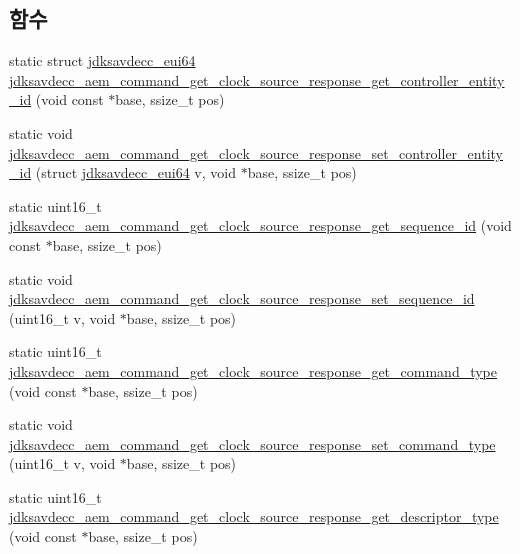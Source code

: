 \subsection*{함수}
\begin{DoxyCompactItemize}
\item 
static struct \hyperlink{structjdksavdecc__eui64}{jdksavdecc\+\_\+eui64} \hyperlink{group__command__get__clock__source__response_gad6f0c4c79b037aecee0801b470d4bec2}{jdksavdecc\+\_\+aem\+\_\+command\+\_\+get\+\_\+clock\+\_\+source\+\_\+response\+\_\+get\+\_\+controller\+\_\+entity\+\_\+id} (void const $\ast$base, ssize\+\_\+t pos)
\item 
static void \hyperlink{group__command__get__clock__source__response_ga8e75d2002ae108cf35d764a3eade7243}{jdksavdecc\+\_\+aem\+\_\+command\+\_\+get\+\_\+clock\+\_\+source\+\_\+response\+\_\+set\+\_\+controller\+\_\+entity\+\_\+id} (struct \hyperlink{structjdksavdecc__eui64}{jdksavdecc\+\_\+eui64} v, void $\ast$base, ssize\+\_\+t pos)
\item 
static uint16\+\_\+t \hyperlink{group__command__get__clock__source__response_ga8e0a46be31cf0c42e08dc7ce1d459a40}{jdksavdecc\+\_\+aem\+\_\+command\+\_\+get\+\_\+clock\+\_\+source\+\_\+response\+\_\+get\+\_\+sequence\+\_\+id} (void const $\ast$base, ssize\+\_\+t pos)
\item 
static void \hyperlink{group__command__get__clock__source__response_ga0212a00ad0ce852f31cdf7c0026e37f0}{jdksavdecc\+\_\+aem\+\_\+command\+\_\+get\+\_\+clock\+\_\+source\+\_\+response\+\_\+set\+\_\+sequence\+\_\+id} (uint16\+\_\+t v, void $\ast$base, ssize\+\_\+t pos)
\item 
static uint16\+\_\+t \hyperlink{group__command__get__clock__source__response_ga2ade4465d89e1b14f91c03ddeedb3873}{jdksavdecc\+\_\+aem\+\_\+command\+\_\+get\+\_\+clock\+\_\+source\+\_\+response\+\_\+get\+\_\+command\+\_\+type} (void const $\ast$base, ssize\+\_\+t pos)
\item 
static void \hyperlink{group__command__get__clock__source__response_gabe6dc7e0a889585088f3feae8f929c84}{jdksavdecc\+\_\+aem\+\_\+command\+\_\+get\+\_\+clock\+\_\+source\+\_\+response\+\_\+set\+\_\+command\+\_\+type} (uint16\+\_\+t v, void $\ast$base, ssize\+\_\+t pos)
\item 
static uint16\+\_\+t \hyperlink{group__command__get__clock__source__response_ga0e8da8583b547be389a3fd8205f78f26}{jdksavdecc\+\_\+aem\+\_\+command\+\_\+get\+\_\+clock\+\_\+source\+\_\+response\+\_\+get\+\_\+descriptor\+\_\+type} (void const $\ast$base, ssize\+\_\+t pos)
\item 

\end{DoxyCompactItemize}

